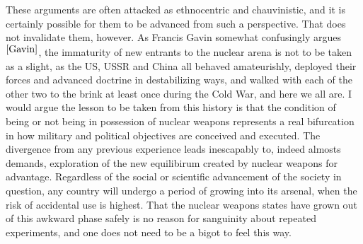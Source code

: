 \documentclass[journal]{IEEEtran}
\begin{document}
These arguments are often attacked as ethnocentric and chauvinistic, and it is certainly possible for them to be advanced from such a perspective.  That does not invalidate them, however.  As Francis Gavin somewhat confusingly argues$^{\cite{Gavin}}$, the immaturity of new entrants to the nuclear arena is not to be taken as a slight, as the US, USSR and China all behaved amateurishly, deployed their forces and advanced doctrine in destabilizing ways, and walked with each of the other two to the brink at least once during the Cold War, and here we all are.  I would argue the lesson to be taken from this history is that the condition of being or not being in possession of nuclear weapons represents a real bifurcation in how military and political objectives are conceived and executed.  The divergence from any previous experience leads inescapably to, indeed almosts demands, exploration of the new equilibirum created by nuclear weapons for advantage.  Regardless of the social or scientific advancement of the society in question, any country will undergo a period of growing into its arsenal, when the risk of accidental use is highest.  That the nuclear weapons states have grown out of this awkward phase safely is no reason for sanguinity about repeated experiments, and one does not need to be a bigot to feel this way.
\end{document}
